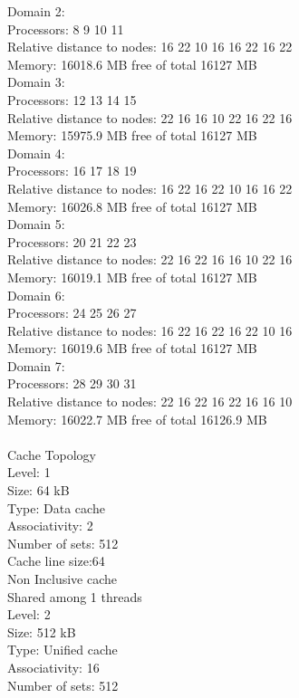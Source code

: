\documentclass[12pt]{article}
\begin{document}
\begin{figure}[ht]
\begin{tt}
Domain 2:\\
Processors:  8 9 10 11\\
Relative distance to nodes:  16 22 10 16 16 22 16 22\\
Memory: 16018.6 MB free of total 16127 MB\\
Domain 3:\\
Processors:  12 13 14 15\\
Relative distance to nodes:  22 16 16 10 22 16 22 16\\
Memory: 15975.9 MB free of total 16127 MB\\
Domain 4:\\
Processors:  16 17 18 19\\
Relative distance to nodes:  16 22 16 22 10 16 16 22\\
Memory: 16026.8 MB free of total 16127 MB\\
Domain 5:\\
Processors:  20 21 22 23\\
Relative distance to nodes:  22 16 22 16 16 10 22 16\\
Memory: 16019.1 MB free of total 16127 MB\\
Domain 6:\\
Processors:  24 25 26 27\\
Relative distance to nodes:  16 22 16 22 16 22 10 16\\
Memory: 16019.6 MB free of total 16127 MB\\
Domain 7:\\
Processors:  28 29 30 31\\
Relative distance to nodes:  22 16 22 16 22 16 16 10\\
Memory: 16022.7 MB free of total 16126.9 MB\\
\\
Cache Topology\\
Level:	1\\
Size:	64 kB\\
Type:	Data cache\\
Associativity:	2\\
Number of sets:	512\\
Cache line size:64\\
Non Inclusive cache\\
Shared among 1 threads\\
Level:	2\\
Size:	512 kB\\
Type:	Unified cache\\
Associativity:	16\\
Number of sets:	512\\

\end{tt}
\end{figure}
\end{document}
